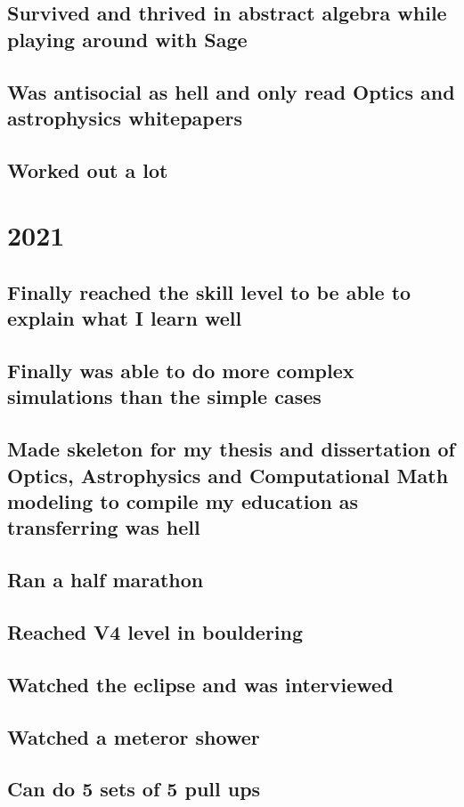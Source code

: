 \documentclass{article}
\begin{document}
\subsection{Survived and thrived in abstract algebra while playing around with Sage}
\subsection{Was antisocial as hell and only read Optics and astrophysics whitepapers}
\subsection{Worked out a lot}
\section{2021}
\subsection{Finally reached the skill level to be able to explain what I learn well}
\subsection{Finally was able to do more complex simulations than the simple cases}
\subsection{Made skeleton for my thesis and dissertation of Optics, Astrophysics and Computational Math modeling to compile my education as transferring was hell}
\subsection{Ran a half marathon}
\subsection{Reached V4 level in bouldering}
\subsection{Watched the eclipse and was interviewed}
\subsection{Watched a meteror shower}
\subsection{Can do 5 sets of 5 pull ups}
\end{document}
